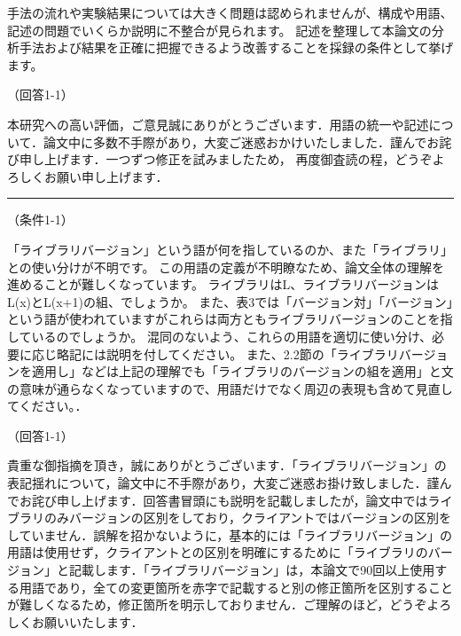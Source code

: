 \documentclass{jarticle} %
\def\subsection#1{ \vspace{1pc} {\gt #1} }
\def\nextans{ \vspace{2pc} \hrule }
\begin{document}
手法の流れや実験結果については大きく問題は認められませんが、構成や用語、記述の問題でいくらか説明に不整合が見られます。
記述を整理して本論文の分析手法および結果を正確に把握できるよう改善することを採録の条件として挙げます。

\subsection{（回答1-1）}

本研究への高い評価，ご意見誠にありがとうございます．用語の統一や記述について．論文中に多数不手際があり，大変ご迷惑おかけいたしました．謹んでお詫び申し上げます．一つずつ修正を試みましたため，
再度御査読の程，どうぞよろしくお願い申し上げます．


      

\newpage
\nextans
\subsection{（条件1-1）}

「ライブラリバージョン」という語が何を指しているのか、また「ライブラリ」との使い分けが不明です。
この用語の定義が不明瞭なため、論文全体の理解を進めることが難しくなっています。
ライブラリはL、ライブラリバージョンはL(x)とL(x+1)の組、でしょうか。
また、表3では「バージョン対」「バージョン」という語が使われていますがこれらは両方ともライブラリバージョンのことを指しているのでしょうか。
混同のないよう、これらの用語を適切に使い分け、必要に応じ略記には説明を付してください。
また、2.2節の「ライブラリバージョンを適用し」などは上記の理解でも「ライブラリのバージョンの組を適用」と文の意味が通らなくなっていますので、用語だけでなく周辺の表現も含めて見直してください。．

\subsection{（回答1-1）}

貴重な御指摘を頂き，誠にありがとうございます．「ライブラリバージョン」の表記揺れについて，論文中に不手際があり，大変ご迷惑お掛け致しました．謹んでお詫び申し上げます．回答書冒頭にも説明を記載しましたが，論文中ではライブラリのみバージョンの区別をしており，クライアントではバージョンの区別をしていません．誤解を招かないように，基本的には「ライブラリバージョン」の用語は使用せず，クライアントとの区別を明確にするために「ライブラリのバージョン」と記載します．「ライブラリバージョン」は，本論文で90回以上使用する用語であり，全ての変更箇所を赤字で記載すると別の修正箇所を区別することが難しくなるため，修正箇所を明示しておりません．ご理解のほど，どうぞよろしくお願いいたします．
\end{document}
